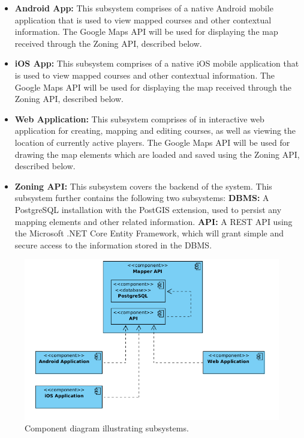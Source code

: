 \documentclass{article}
\begin{document}
    \begin{itemize}
        \item \textbf{Android App:} This subsystem comprises of a native
            Android mobile application that is used to view mapped courses and
            other contextual information. The Google Maps API will be used for
            displaying the map received through the Zoning API, described
            below.
        \item \textbf{iOS App:} This subsystem comprises of a native iOS mobile
            application that is used to view mapped courses and other
            contextual information. The Google Maps API will be used for
            displaying the map received through the Zoning API, described
            below.
        \item \textbf{Web Application:} This subsystem comprises of in
            interactive web application for creating, mapping and editing
            courses, as well as viewing the location of currently active
            players. The Google Maps API will be used for drawing the map
            elements which are loaded and saved using the Zoning API, described
            below.
        \item \textbf{Zoning API:} This subsystem covers the backend of the
            system. This subsystem further contains the following two
            subsystems:
            \subitem \textbf{DBMS:} A PostgreSQL installation with the PostGIS
            extension, used to persist any mapping elements and other related
            information.
            \subitem \textbf{API:} A REST API using the Microsoft .NET Core
            Entity Framework, which will grant simple and secure access to the
            information stored in the DBMS.
    \end{itemize}

    \begin{figure}[H]
        \centering
        \includegraphics[scale=0.45]{ComponentDiagram}
        \caption{Component diagram illustrating subsystems.}
        \label{fig:component}
    \end{figure}
\end{document}
